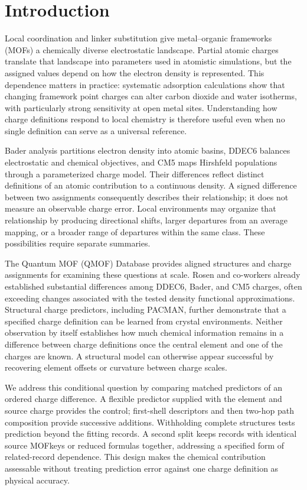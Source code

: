 \section{Introduction}
Local coordination and linker substitution give metal--organic frameworks (MOFs) a chemically diverse electrostatic landscape. Partial atomic charges translate that landscape into parameters used in atomistic simulations, but the assigned values depend on how the electron density is represented. This dependence matters in practice: systematic adsorption calculations show that changing framework point charges can alter carbon dioxide and water isotherms, with particularly strong sensitivity at open metal sites.\cite{Sladekova2020,SladekovaCorrection2021} Understanding how charge definitions respond to local chemistry is therefore useful even when no single definition can serve as a universal reference.

Bader analysis partitions electron density into atomic basins, DDEC6 balances electrostatic and chemical objectives, and CM5 maps Hirshfeld populations through a parameterized charge model.\cite{Tang2009,Manz2016,ManzCorrection2022,Marenich2012} Their differences reflect distinct definitions of an atomic contribution to a continuous density. A signed difference between two assignments consequently describes their relationship; it does not measure an observable charge error. Local environments may organize that relationship by producing directional shifts, larger departures from an average mapping, or a broader range of departures within the same class. These possibilities require separate summaries.

The Quantum MOF (QMOF) Database provides aligned structures and charge assignments for examining these questions at scale.\cite{Rosen2021} Rosen and co-workers already established substantial differences among DDEC6, Bader, and CM5 charges, often exceeding changes associated with the tested density functional approximations.\cite{Rosen2022} Structural charge predictors, including PACMAN, further demonstrate that a specified charge definition can be learned from crystal environments.\cite{Zhao2024,Zhao2024Correction} Neither observation by itself establishes how much chemical information remains in a difference between charge definitions once the central element and one of the charges are known. A structural model can otherwise appear successful by recovering element offsets or curvature between charge scales.

We address this conditional question by comparing matched predictors of an ordered charge difference. A flexible predictor supplied with the element and source charge provides the control; first-shell descriptors and then two-hop path composition provide successive additions. Withholding complete structures tests prediction beyond the fitting records. A second split keeps records with identical source MOFkeys or reduced formulas together, addressing a specified form of related-record dependence. This design makes the chemical contribution assessable without treating prediction error against one charge definition as physical accuracy.

